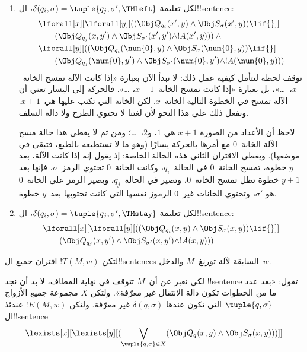 \documentclass[../../../include/open-logic-section]{subfiles}
\begin{document}
\begin{enumerate}
\begin{enumerate}
\item {} لكل تعليمة
$\delta(q_i,\sigma)=\tuple{q_j,\sigma',\TMleft}$، ال!!{sentence}:
\begin{align*}
& \lforall[x][\lforall[y][
    ((\Obj Q_{q_i}(x', y) \land \Obj S_{\sigma}(x', y)) \lif {}]]\\
& \qquad   (\Obj Q_{q_j}(x, y') \land \Obj S_{\sigma'}(x', y') \land
!A(x', y))) \land {}\\
& \lforall[y][((\Obj Q_{q_i}(\num{0}, y) \land \Obj S_{\sigma}(\num{0},
    y)) \lif {}]\\
& \qquad (\Obj Q_{q_j}(\num{0}, y') \land \Obj S_{\sigma'}(\num{0},
  y') \land !A(\num{0}, y)))
\end{align*}
توقف لحظة لتتأمل كيفية عمل ذلك: لا نبدأ الآن بعبارة «إذا كانت الآلة
تمسح الخانة~$x$،~\dots»، بل بعبارة «إذا كانت تمسح الخانة~$x+1$،
\dots». فالحركة إلى اليسار تعني أن الآلة تمسح في الخطوة التالية
الخانة~$x$. لكن الخانة التي تكتب عليها هي~$x+1$. ونفعل ذلك على هذا
النحو لأن لغتنا لا تحتوي الطرح ولا دالة السلف.

لاحظ أن الأعداد من الصورة $x+1$ هي $1$، و$2$،~\dots؛ ومن ثم لا يغطي
هذا حالة مسح الآلة الخانة~$0$ مع أمرها بالحركة يسارًا (وهو ما لا
تستطيعه بالطبع، فتبقى في موضعها). ويغطي الاقتران الثاني هذه الحالة
الخاصة: إذ يقول إنه إذا كانت الآلة، بعد $y$ خطوة، تمسح الخانة~$0$ في
الحالة~$q_i$، وكانت الخانة~$0$ تحتوي الرمز~$\sigma$، فإنها بعد $y+1$
خطوة تظل تمسح الخانة~$0$، وتصير في الحالة~$q_j$، ويصير الرمز على
الخانة~$0$ هو $\sigma'$، وتحتوي الخانات غير~$0$ الرموز نفسها التي
كانت تحتويها بعد~$y$ خطوة.
\item {} لكل تعليمة
$\delta(q_i,\sigma)=\tuple{q_j,\sigma',\TMstay}$، ال!!{sentence}:
\begin{align*}
& \lforall[x][\lforall[y][(
   (\Obj Q_{q_i}(x, y) \land \Obj S_{\sigma}(x, y)) \lif {}]] \\
&\qquad   (\Obj Q_{q_j}(x, y') \land \Obj S_{\sigma'}(x, y') \land
!A(x, y)))
\end{align*}
\end{enumerate}
\end{enumerate}
لتكن $!T(M,w)$ اقتران جميع ال!!{sentence}s السابقة لآلة تورنغ~$M$
والدخل~$w$.

لكي نعبر عن أن~$M$ تتوقف في نهاية المطاف، لا بد أن نجد !!{sentence}
تقول: «بعد عدد ما من الخطوات تكون دالة الانتقال غير معرّفة». ولتكن
$X$ مجموعة جميع الأزواج $\tuple{q,\sigma}$ التي تكون عندها
$\delta(q,\sigma)$ غير معرّفة. ولتكن $!E(M,w)$ عندئذ ال!!{sentence}
\[
\lexists[x][\lexists[y][(\bigvee_{\tuple{q, \sigma} \in
      X}(\Obj Q_q(x, y) \land \Obj S_\sigma(x, y)))]]
\]
\end{document}
